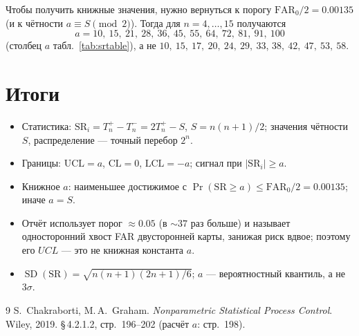 \documentclass[11pt,a4paper]{article}
\newcommand{\SR}{\mathrm{SR}}
\newcommand{\FAR}{\mathrm{FAR}}
\newcommand{\FARz}{\FAR_0}
\begin{document}
Чтобы получить книжные значения, нужно вернуться к порогу
$\FARz/2=0.00135$ (и к чётности $a\equiv S\pmod2$). Тогда для
$n=4,\dots,15$ получаются
\[
a = 10,\ 15,\ 21,\ 28,\ 36,\ 45,\ 55,\ 64,\ 72,\ 81,\ 91,\ 100
\]
(столбец $a$ табл.~\eqref{tab:srtable}), а не
$10,\ 15,\ 17,\ 20,\ 24,\ 29,\ 33$,
$38,\ 42,\ 47,\ 53,\ 58$.

\section{Итоги}

\begin{itemize}
\item Статистика: $\SR_i=T_n^{+}-T_n^{-}=2T_n^{+}-S$, $S=n(n+1)/2$;
      значения чётности $S$, распределение --- точный перебор $2^n$.
\item Границы: $\mathrm{UCL}=a$, $\mathrm{CL}=0$, $\mathrm{LCL}=-a$;
      сигнал при $|\SR_i|\ge a$.
\item Книжное $a$: наименьшее достижимое с $\Pr(\SR\ge a)\le\FARz/2=0.00135$;
      иначе $a=S$.
\item Отчёт использует порог $\approx0.05$ (в $\sim37$ раз больше) и
      называет односторонний хвост FAR двусторонней карты, занижая риск
      вдвое; поэтому его $UCL$ --- это не книжная константа $a$.
\item $\operatorname{SD}(\SR)=\sqrt{n(n+1)(2n+1)/6}$; $a$ ---
      вероятностный квантиль, а не $3\sigma$.
\end{itemize}

\begin{thebibliography}{9}
S.~Chakraborti, M.\,A.~Graham.
\textit{Nonparametric Statistical Process Control}.
Wiley, 2019. \S\,4.2.1.2, стр.~196--202 (расчёт $a$: стр.~198).
\end{thebibliography}
\end{document}
